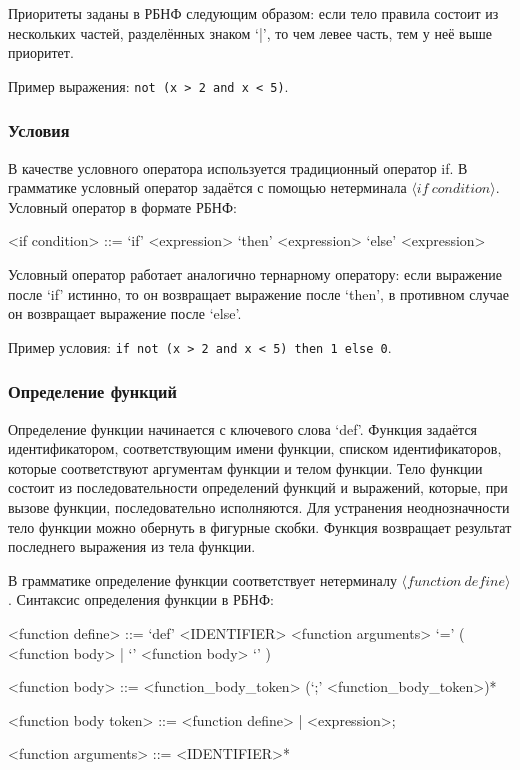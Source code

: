 \documentclass[12pt,a4paper,oneside]{extarticle}
\begin{document}
            Приоритеты заданы в РБНФ следующим образом: если тело правила состоит из нескольких частей, разделённых знаком `|', то чем левее часть, тем у неё выше приоритет.

            Пример выражения: \lstinline$not (x > 2 and x < 5)$.

        \subsubsection{Условия}
            В качестве условного оператора используется традиционный оператор if. В грамматике условный оператор задаётся с помощью нетерминала $\langle if~condition \rangle$. Условный оператор в формате РБНФ:
            \begin{grammar}
                <if condition> ::= `if' <expression> `then' <expression> `else' <expression>
            \end{grammar}
            Условный оператор работает аналогично тернарному оператору: если выражение после `if' истинно, то он возвращает выражение после `then', в противном случае он возвращает выражение после `else'.

            Пример условия: \lstinline$if not (x > 2 and x < 5) then 1 else 0$.

        \subsubsection{Определение функций}
            Определение функции начинается с ключевого слова `def'.
            Функция задаётся идентификатором, соответствующим имени функции, списком идентификаторов, которые соответствуют аргументам функции и телом функции.
            Тело функции состоит из последовательности определений функций и выражений, которые, при вызове функции, последовательно исполняются.
            Для устранения неоднозначности тело функции можно обернуть в фигурные скобки.
            Функция возвращает результат последнего выражения из тела функции.

            В грамматике определение функции соответствует нетерминалу $\langle function~define \rangle$. Синтаксис определения функции в РБНФ:

            \begin{grammar}
                <function define> ::= `def' <IDENTIFIER> <function arguments> `=' ( <function body> | `{' <function body> `}' )

                <function body> ::= <function_body_token> (`;' <function_body_token>)*

                <function body token> ::= <function define> | <expression>;

                <function arguments> ::= <IDENTIFIER>*
            \end{grammar}
\end{document}
